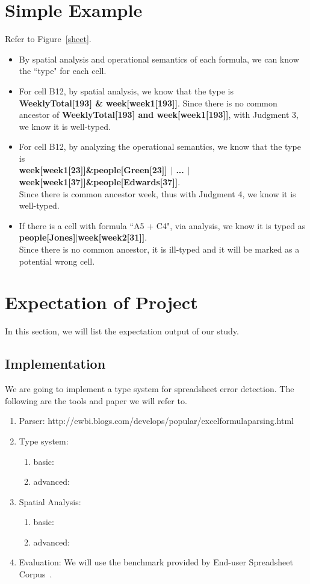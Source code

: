 \documentclass[a4paper]{article}
\begin{document}
\section{Simple Example}
Refer to Figure~\ref{sheet}.
\begin{itemize}
\item By spatial analysis and operational semantics of each formula, we can know the ``type" for each cell. 
\item For cell B12, by spatial analysis, we know that the type is \textbf{WeeklyTotal[193] \& week[week1[193]]}. Since there is no common ancestor of \textbf{WeeklyTotal[193] and week[week1[193]]}, with Judgment 3, we know it is well-typed.
\item For cell B12, by analyzing the operational semantics, we know that the type is \\
\textbf{week[week1[23]]\&people[Green[23]] $|$ ... $|$ week[week1[37]]\&people[Edwards[37]]}. \\
Since there is common ancestor week, thus with Judgment 4, we know it is well-typed.
\item If there is a cell with formula ``A5 + C4", via analysis, we know it is typed as \textbf{people[Jones]$|$week[week2[31]]}.\\ 
Since there is no common ancestor, it is ill-typed and it will be marked as a potential wrong cell.
\end{itemize}

\section{Expectation of Project}
In this section, we will list the expectation output of our study.
\subsection{Implementation}
We are going to implement a type system for spreadsheet error detection. The following are the tools and paper we will refer to.
\begin{enumerate}
\item Parser: http://ewbi.blogs.com/develops/popular/excelformulaparsing.html
\item Type system:
  \begin{enumerate}
	\item basic: \cite{Abraham2006}
    \item advanced: \cite{Cunha2015}
  \end{enumerate}
\item Spatial Analysis:
  \begin{enumerate}
	\item basic: \cite{Abraham2004}
    \item advanced: \cite{Chambers2009a}
  \end{enumerate}
\item Evaluation: We will use the benchmark provided by End-user Spreadsheet Corpus~\cite{fisher2005euses}.
\end{enumerate}
\end{document}
